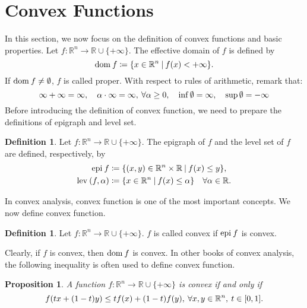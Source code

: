 \documentclass[a4paper,11pt, oneside]{book}
\newtheorem{prop}[thm]{Proposition}
\theoremstyle{definition}
\newtheorem{dfn}[thm]{Definition}
\newcommand{\RealNumberSet}{\mathbb{R}}
\newcommand{\NDemenstionalRealEuclideanSpace}{\mathbb{R}^n}
\newcommand{\Domain}[1]{\text{\rm dom\:${#1}$}} %
\newcommand{\Epigraph}[1]{\text{\rm epi\:${#1}$}} %
\newcommand{\LevelSets}[2]{\text{\rm lev\:$({#1}, {#2})$}} %
\newcommand{\ExtendedRealValuedFunction}[2]{{#1}: {#2} \to \RealNumberSet \cup \{+\infty\}}
\newcommand{\SetForm}[2]{
  \{{#1}\:|\:{#2}\}
}
\begin{document}
\section{Convex Functions}
In this section, we now focus on the definition of convex functions and basic properties.
Let $\ExtendedRealValuedFunction{f}{\NDemenstionalRealEuclideanSpace}$. The effective domain of $f$ is defined by
\begin{equation}
  \Domain{f} \coloneqq \SetForm{x \in \NDemenstionalRealEuclideanSpace}{f(x) < +\infty}. \notag
\end{equation}
If $\Domain{f} \neq \emptyset$, $f$ is called proper. With respect to rules of arithmetic, remark that:
\begin{equation}
  \infty + \infty = \infty, \quad \alpha \cdot \infty = \infty,\:\forall \alpha \geq 0, \quad \inf \emptyset = \infty, \quad \sup \emptyset = -\infty \notag
\end{equation}
Before introducing the definition of convex function, we need to prepare the definitions of epigraph and level set.

\begin{dfn}
  Let $\ExtendedRealValuedFunction{f}{\NDemenstionalRealEuclideanSpace}$.
  The epigraph of $f$ and the level set of $f$ are defined, respectively, by
  \begin{equation}
    \begin{split}
      \Epigraph{f} &\coloneqq \SetForm{(x,y) \in \NDemenstionalRealEuclideanSpace \times \RealNumberSet}{f(x) \leq y}, \\
      \LevelSets{f}{\alpha} &\coloneqq \SetForm{x \in \NDemenstionalRealEuclideanSpace}{f(x) \leq \alpha} \quad \forall \alpha \in \RealNumberSet. \notag
    \end{split}
  \end{equation}
\end{dfn}
In convex analysis, convex function is one of the most important concepts. We now define convex function.
\begin{dfn}
  Let $\ExtendedRealValuedFunction{f}{\NDemenstionalRealEuclideanSpace}$. $f$ is called convex if $\Epigraph{f}$ is convex.
\end{dfn}

Clearly, if $f$ is convex, then $\Domain{f}$ is convex. In other books of convex analysis, the following inequality is often used to define convex function.

\begin{prop}
  A function $\ExtendedRealValuedFunction{f}{\NDemenstionalRealEuclideanSpace}$ is convex if and only if
  \begin{equation}
    f(tx + (1-t)y) \leq tf(x) + (1-t)f(y),\:\forall x,y \in \NDemenstionalRealEuclideanSpace,\:t \in [0,1]. \notag
  \end{equation}
\end{prop}
\end{document}
